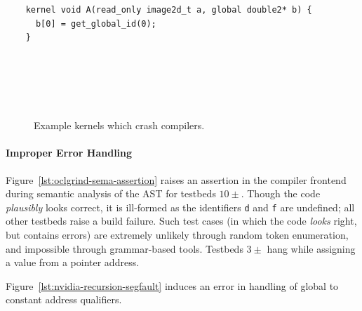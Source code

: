 \newsavebox{\IntelGtDoubleAssertion}
\begin{lrbox}{\IntelGtDoubleAssertion}
  \hspace{1.5em}
  \begin{lstlisting}
    kernel void A(read_only image2d_t a, global double2* b) {
      b[0] = get_global_id(0);
    }
  \end{lstlisting}
\end{lrbox}

\begin{figure}
  \centering %
  \\%
  \\%
  \\%
  \\%
  \caption{Example kernels which crash compilers.}%
  \label{lst:compiler-crashes}%
\end{figure}

\paragraph{Improper Error Handling} Figure~\ref{lst:oclgrind-sema-assertion} raises an assertion in the compiler frontend during semantic analysis of the AST for testbeds $10\pm$. Though the code \emph{plausibly} looks correct, it is ill-formed as the identifiers \texttt{d} and \texttt{f} are undefined; all other testbeds raise a build failure. Such test cases (in which the code \emph{looks} right, but contains errors) are extremely unlikely through random token enumeration, and impossible through grammar-based tools. Testbeds $3\pm$ hang while assigning a value from a pointer address.

Figure~\ref{lst:nvidia-recursion-segfault} induces an error in handling of global to constant address qualifiers.

